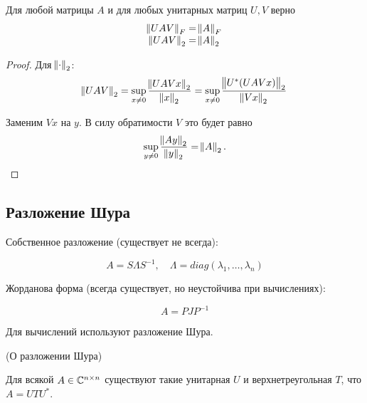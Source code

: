 \begin{point}
    Для любой матрицы $A$ и для любых унитарных матриц $U, V$ верно
    \[
        \begin{array}{c}
            \norm{U A V}_F = \norm{A}_F \\
            \norm{U A V}_2 = \norm{A}_2
        \end{array}
    \]
\end{point}

\begin{proof}
    Для $\norm{\cdot}_2$:
    \[
        \norm{U A V}_2 = \sup_{x \ne 0} \frac{\norm{U A V x}_2}{\norm{x}_2}
        = \sup_{x \ne 0} \frac{\norm{U^*(U A V x)}_2}{\norm{V x}_2}
    \]

    Заменим $V x$ на $y$. В силу обратимости $V$ это будет равно
    \[
        \sup_{y \ne 0} \frac{\norm{A y}_2}{\norm{y}_2} = \norm{A}_2.
    \]
\end{proof}

\subsection{Разложение Шура}

Собственное разложение (существует не всегда):

\[
    A = S \Lambda S^{-1}, \quad \Lambda = diag(\lambda_1, \dots, \lambda_n)
\]

Жорданова форма (всегда существует, но неустойчива при вычислениях):

\[
    A = P J P^{-1}
\]

Для вычислений используют разложение Шура.

\begin{theorem}
    (О разложении Шура)

    Для всякой $A \in \mathbb{C}^{n \times n}$ существуют такие унитарная $U$ и
    верхнетреугольная $T$, что $A = U T U^*$.
\end{theorem}


